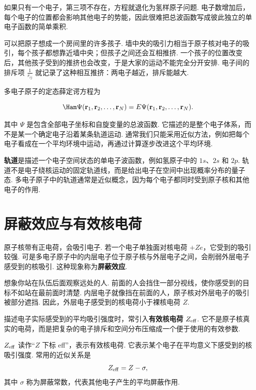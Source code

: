 \documentclass[UTF8,11pt,a4paper,openany]{ctexbook}
\newcommand{\term}[1]{\textbf{#1}}
\begin{document}
如果只有一个电子，第三项不存在，方程就退化为氢样原子问题. 电子数增加后，每个电子的位置都会影响其他电子的势能，因此很难把总波函数写成彼此独立的单电子函数的简单乘积. 

\begin{analogybox}
可以把原子想成一个房间里的许多孩子. 墙中央的吸引力相当于原子核对电子的吸引，每个孩子都想靠近墙中央；但孩子之间还会互相推挤. 一个孩子的位置改变后，其他孩子受到的推挤也会改变，于是大家的运动不能完全分开安排. 电子间的排斥项 $\frac{1}{r_{ij}}$ 就记录了这种相互推挤：两电子越近，排斥能越大. 
\end{analogybox}

多电子原子的定态薛定谔方程为

\[
\Ham\Psi(\mathbf r_1,\mathbf r_2,\ldots,\mathbf r_N)
=
E\Psi(\mathbf r_1,\mathbf r_2,\ldots,\mathbf r_N).
\]

其中 $\Psi$ 是包含全部电子坐标和自旋变量的总波函数. 它描述的是整个电子体系，而不是某一个确定电子沿着某条轨道运动. 通常我们只能采用近似方法，例如把每个电子看成在一个平均环境中运动，再通过计算逐步改进这个平均环境. 

\begin{definitionbox}
\term{轨道}是描述一个电子空间状态的单电子波函数，例如氢原子中的 $1s$、$2s$ 和 $2p$. 轨道不是电子绕核运动的固定轨道线，而是给出电子在空间中出现概率分布的量子态. 多电子原子中的轨道通常是近似概念，因为每个电子都同时受到原子核和其他电子的作用. 
\end{definitionbox}

\section{屏蔽效应与有效核电荷}

原子核带有正电荷，会吸引电子. 若一个电子单独面对核电荷 $+Ze$，它受到的吸引较强. 可是多电子原子中的内层电子位于原子核与外层电子之间，会削弱外层电子感受到的核吸引. 这种现象称为\term{屏蔽效应}. 

\begin{analogybox}
想象你站在队伍后面观察远处的人. 前面的人会挡住一部分视线，使你感受到的目标不如站在最前面时清楚. 内层电子就像挡在前面的人，原子核对外层电子的吸引被部分遮挡. 因此，外层电子感受到的核电荷小于裸核电荷 $Z$. 
\end{analogybox}

描述电子实际感受到的平均吸引强度时，常引入\term{有效核电荷} $Z_{\rm eff}$. 它不是原子核真实的电荷，而是把复杂的电子排斥和空间分布压缩成一个便于使用的有效参数. 

\begin{notationbox}
$Z_{\rm eff}$ 读作“$Z$ 下标 eff”，表示有效核电荷. 它表示某个电子在平均意义下感受到的核吸引强度. 常用的近似关系是
\[
Z_{\rm eff}=Z-\sigma,
\]
其中 $\sigma$ 称为屏蔽常数，代表其他电子产生的平均屏蔽作用. 
\end{notationbox}
\end{document}
